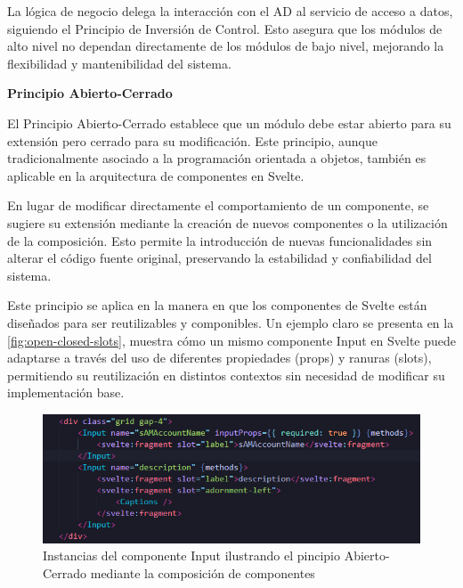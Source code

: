 La lógica de negocio delega la interacción con el AD al servicio de acceso a datos, siguiendo el Principio de Inversión de Control. Esto asegura que los módulos de alto nivel no dependan directamente de los módulos de bajo nivel, mejorando la flexibilidad y mantenibilidad del sistema.

\textbf{Principio Abierto-Cerrado}

El Principio Abierto-Cerrado establece que un módulo debe estar abierto para su extensión pero cerrado para su modificación. Este principio, aunque tradicionalmente asociado a la programación orientada a objetos, también es aplicable en la arquitectura de componentes en Svelte.

En lugar de modificar directamente el comportamiento de un componente, se sugiere su extensión mediante la creación de nuevos componentes o la utilización de la composición. Esto permite la introducción de nuevas funcionalidades sin alterar el código fuente original, preservando la estabilidad y confiabilidad del sistema.

Este principio se aplica en la manera en que los componentes de Svelte están diseñados para ser reutilizables y componibles. Un ejemplo claro se presenta en la \autoref{fig:open-closed-slots}, muestra cómo un mismo componente Input en Svelte puede adaptarse a través del uso de diferentes propiedades (props) y ranuras (slots), permitiendo su reutilización en distintos contextos sin necesidad de modificar su implementación base.

\begin{figure}[h]
    \centering
    \includegraphics[width=\linewidth]{images/code/open-closed-slots.png}
    \caption{Instancias del componente Input ilustrando el pincipio Abierto-Cerrado mediante la composición de componentes}
    \label{fig:open-closed-slots}
\end{figure}